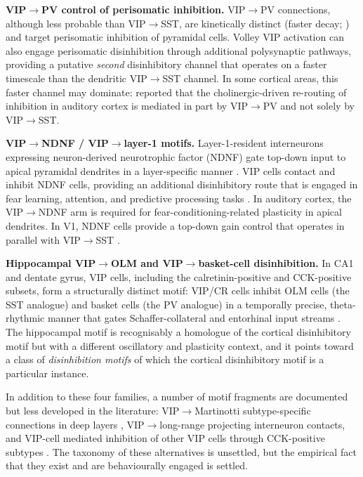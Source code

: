 \documentclass[11pt]{article}
\let\origrightarrow\rightarrow
\def\rightarrow{\ensuremath{\origrightarrow}}
\begin{document}
\textbf{VIP\rightarrow PV control of perisomatic inhibition.} VIP\rightarrow PV connections, although less probable than VIP\rightarrow SST, are kinetically distinct (faster decay; \citep{Pi2013}) and target perisomatic inhibition of pyramidal cells. Volley VIP activation can also engage perisomatic disinhibition through additional polysynaptic pathways, providing a putative \textit{second} disinhibitory channel that operates on a faster timescale than the dendritic VIP\rightarrow SST channel. In some cortical areas, this faster channel may dominate: \citet{Kuchibhotla2017} reported that the cholinergic-driven re-routing of inhibition in auditory cortex is mediated in part by VIP\rightarrow PV and not solely by VIP\rightarrow SST.

\textbf{VIP\rightarrow NDNF / VIP\rightarrow layer-1 motifs.} Layer-1-resident interneurons expressing neuron-derived neurotrophic factor (NDNF) gate top-down input to apical pyramidal dendrites in a layer-specific manner \citep{Abs2018, Anastasiades2021a, Veit2023}. VIP cells contact and inhibit NDNF cells, providing an additional disinhibitory route that is engaged in fear learning, attention, and predictive processing tasks \citep{Krabbe2019, Veit2023}. In auditory cortex, the VIP\rightarrow NDNF arm is required for fear-conditioning-related plasticity in apical dendrites. In V1, NDNF cells provide a top-down gain control that operates in parallel with VIP\rightarrow SST \citep{Veit2023}.

\textbf{Hippocampal VIP\rightarrow OLM and VIP\rightarrow basket-cell disinhibition.} In CA1 and dentate gyrus, VIP cells, including the calretinin-positive and CCK-positive subsets, form a structurally distinct motif: VIP/CR cells inhibit OLM cells (the SST analogue) and basket cells (the PV analogue) in a temporally precise, theta-rhythmic manner that gates Schaffer-collateral and entorhinal input streams \citep{Turi2019}. The hippocampal motif is recognisably a homologue of the cortical disinhibitory motif but with a different oscillatory and plasticity context, and it points toward a class of \textit{disinhibition motifs} of which the cortical disinhibitory motif is a particular instance.

In addition to these four families, a number of motif fragments are documented but less developed in the literature: VIP\rightarrow Martinotti subtype-specific connections in deep layers \citep{Anastasiades2021a, Schneidermizell2025}, VIP\rightarrow long-range projecting interneuron contacts, and VIP-cell mediated inhibition of other VIP cells through CCK-positive subtypes \citep{Garrett2020}. The taxonomy of these alternatives is unsettled, but the empirical fact that they exist and are behaviourally engaged is settled.
\end{document}
